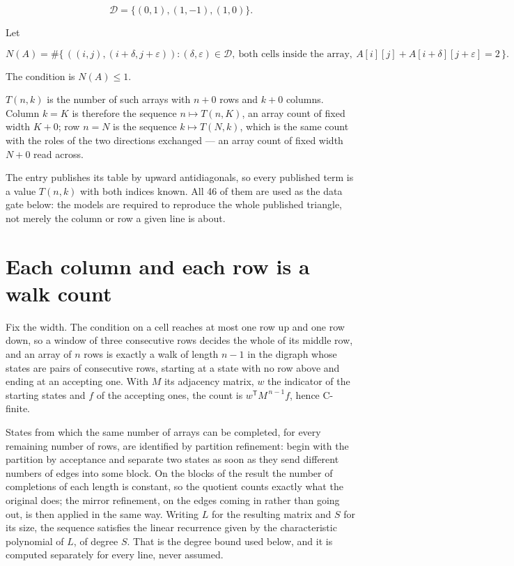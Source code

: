 \documentclass[11pt]{article}
\theoremstyle{definition}
\begin{document}
\[\mathcal{D} = \{(0,1), (1,-1), (1,0)\}.\]

Let

\[N(A) = \#\bigl\{\,((i,j),(i{+}\delta,j{+}\varepsilon)) : (\delta,\varepsilon) \in \mathcal{D},\ \text{both cells inside the array},\ A[i][j] + A[i{+}\delta][j{+}\varepsilon] = 2\,\bigr\}.\]

The condition is $N(A) \le 1$.

$T(n,k)$ is the number of such arrays with $n + 0$ rows and $k + 0$ columns. Column $k = K$ is therefore the sequence $n \mapsto T(n,K)$, an array count of fixed width $K + 0$; row $n = N$ is the sequence $k \mapsto T(N,k)$, which is the same count with the roles of the two directions exchanged --- an array count of fixed width $N + 0$ read across.

The entry publishes its table by upward antidiagonals, so every published term is a value $T(n,k)$ with both indices known. All 46 of them are used as the data gate below: the models are required to reproduce the whole published triangle, not merely the column or row a given line is about.

\section{Each column and each row is a walk count}

Fix the width. The condition on a cell reaches at most one row up and one row down, so a window of three consecutive rows decides the whole of its middle row, and an array of $n$ rows is exactly a walk of length $n-1$ in the digraph whose states are pairs of consecutive rows, starting at a state with no row above and ending at an accepting one. With $M$ its adjacency matrix, $w$ the indicator of the starting states and $f$ of the accepting ones, the count is $w^{\mathsf T}M^{\,n-1}f$, hence C-finite.

States from which the same number of arrays can be completed, for every remaining number of rows, are identified by partition refinement: begin with the partition by acceptance and separate two states as soon as they send different numbers of edges into some block. On the blocks of the result the number of completions of each length is constant, so the quotient counts exactly what the original does; the mirror refinement, on the edges coming in rather than going out, is then applied in the same way. Writing $L$ for the resulting matrix and $S$ for its size, the sequence satisfies the linear recurrence given by the characteristic polynomial of $L$, of degree $S$. That is the degree bound used below, and it is computed separately for every line, never assumed.
\end{document}
